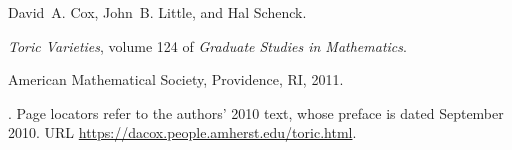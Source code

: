 David~A. Cox, John~B. Little, and Hal Schenck.

\newblock \emph{Toric Varieties}, volume 124 of \emph{Graduate Studies in
  Mathematics}.

\newblock American Mathematical Society, Providence, RI, 2011.

\newblock {}.
\newblock Page locators refer to the authors' 2010 text, whose preface is
  dated September 2010.
\newblock URL \url{https://dacox.people.amherst.edu/toric.html}.


